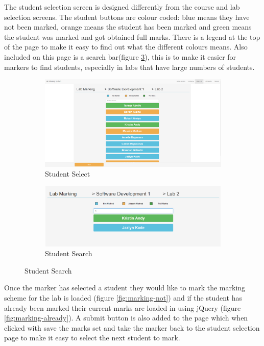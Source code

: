 \documentclass[12pt]{article}  %
\begin{document}
\noindent The student selection screen is designed differently from the course and lab selection screens. The student buttons are colour coded: blue means they have not been marked, orange means the student has been marked and green means the student was marked and got obtained full marks. There is a legend at the top of the page to make it easy to find out what the different colours means. Also included on this page is a search bar(figure \ref{fig:marking-search}), this is to make it easier for markers to find students, especially in labs that have large numbers of students.

\begin{figure}[H]
\caption{Selecting Student Page}
\centering
\begin{subfigure}[c]{0.45\textwidth}
    \includegraphics[width=1\textwidth]{images/implementation/marking-3-page.png}
    \caption{Student Select}
    \label{fig:marking-student}
\end{subfigure}
\hfill
\begin{subfigure}[c]{0.45\textwidth}
    \includegraphics[width=1\textwidth]{images/implementation/marking-4-page.png}
    \caption{Student Search}
    \label{fig:marking-search}
\end{subfigure}

\end{figure}

\noindent Once the marker has selected a student they would like to mark the marking scheme for the lab is loaded (figure \ref{fig:marking-not}) and if the student has already been marked their current marks are loaded in using jQuery (figure \ref{fig:marking-already}). A submit button is also added to the page which when clicked with save the marks set and take the marker back to the student selection page to make it easy to select the next student to mark.
\end{document}

